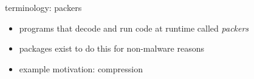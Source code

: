 \begin{frame}{terminology: packers}
    \begin{itemize}
    \item programs that decode and run code at runtime called \textit{packers}
    \item packages exist to do this for non-malware reasons
    \item example motivation: compression
    \end{itemize}
\end{frame}
